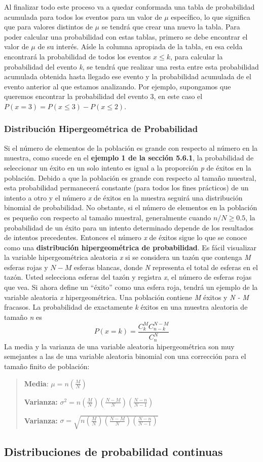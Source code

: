 \documentclass[]{article}
\begin{document}
 Al finalizar todo este proceso va a quedar conformada una tabla de probabilidad acumulada para todos los eventos para un valor de $\mu$ específico, lo que significa que para valores distintos de $\mu$ se tendrá que crear una nuevo la tabla.
 Para poder calcular una probabilidad con estas tablas, primero se debe encontrar el valor de $\mu$ de su interés. Aísle la columna apropiada de la tabla, en esa celda encontrará la probabilidad de todos los eventos $x \leq k$, para calcular la probabilidad del evento \textit{k}, se tendrá que realizar una resta entre esta probabilidad acumulada obtenida hasta llegado ese evento y la probabilidad acumulada de el evento anterior al que estamos analizando. Por ejemplo, supongamos que queremos encontrar la probabilidad del evento 3, en este caso el $P(x = 3) = P(x \leq 3) - P(x \leq 2)$.
 \subsubsection{Distribución Hipergeométrica de Probabilidad}
 Si el número de elementos de la población es grande con respecto al número en la muestra, como sucede en el \textbf{ejemplo 1 de la sección 5.6.1}, la probabilidad de seleccionar un éxito en un solo intento es igual a la proporción \textit{p} de éxitos en la población. Debido a que la población es grande con respecto al tamaño muestral, esta probabilidad permanecerá constante (para todos los fines prácticos) de un intento a otro y el número \textit{x} de éxitos en la muestra seguirá una distribución binomial de probabilidad. No obstante, si el número de elementos en la población es pequeño con respecto al tamaño muestral, generalmente cuando $n/N \geq 0.5$, la probabilidad de un éxito para un intento determinado depende de los resultados de intentos precedentes. Entonces el número \textit{x} de éxitos sigue lo que se conoce como una \textbf{distribución hipergeométrica de probabilidad}. \newline
 Es fácil visualizar la variable hipergeométrica aleatoria \textit{x} si se considera un tazón que contenga \textit{M} esferas rojas y $N - M$ esferas blancas, donde \textit{N}  representa el total de esferas en el tazón. Usted selecciona  esferas del tazón y registra \textit{x}, el número de esferas rojas que vea. Si ahora define un “éxito” como una esfera roja, tendrá un ejemplo de la variable aleatoria \textit{x} hipergeométrica.\newline
 Una población contiene \textit{M} éxitos y \textit{N - M} fracasos. La probabilidad de exactamente \textit{k} éxitos en una muestra aleatoria de tamaño \textit{n} es
 \[ P(x = k) = \frac{C^M_kC^{N-M}_{n-k}}{C^N_n} \]
 La media y la varianza de una variable aleatoria hipergeométrica son muy semejantes a las de una variable aleatoria binomial con una corrección para el tamaño finito de población:
 \begin{quote}
 	\item \textbf{Media}: $\mu = n(\frac{M}{N})$
 	\item \textbf{Varianza:} $\sigma^2 = n(\frac{M}{N})(\frac{N-M}{N})(\frac{N-n}{N-1})$
 	\item \textbf{Varianza:} $\sigma = \sqrt{n(\frac{M}{N})(\frac{N-M}{N})(\frac{N-n}{N-1})}$
 \end{quote}
\subsection{Distribuciones de probabilidad continuas}
\end{document}
